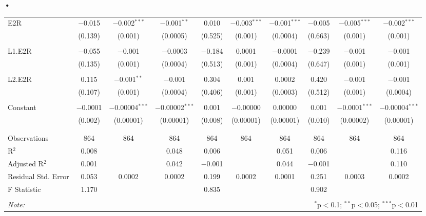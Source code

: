 \textbf{\textbf{•}}\documentclass[a4paper]{article}
\begin{document}
\begin{table}[!htbp]
{\begin{tabular}{@{\extracolsep{5pt}}lccccccccc}
 E2R & $-$0.015 & $-$0.002$^{***}$ & $-$0.001$^{**}$ & 0.010 & $-$0.003$^{***}$ & $-$0.001$^{***}$ & $-$0.005 & $-$0.005$^{***}$ & $-$0.002$^{***}$ \\ 
  & (0.139) & (0.001) & (0.0005) & (0.525) & (0.001) & (0.0004) & (0.663) & (0.001) & (0.001) \\ 
  & & & & & & & & & \\ 
 L1.E2R & $-$0.055 & $-$0.001 & $-$0.0003 & $-$0.184 & 0.0001 & $-$0.0001 & $-$0.239 & $-$0.001 & $-$0.001 \\ 
  & (0.135) & (0.001) & (0.0004) & (0.513) & (0.001) & (0.0004) & (0.647) & (0.001) & (0.001) \\ 
  & & & & & & & & & \\ 
 L2.E2R & 0.115 & $-$0.001$^{**}$ & $-$0.001 & 0.304 & 0.001 & 0.0002 & 0.420 & $-$0.001 & $-$0.001 \\ 
  & (0.107) & (0.001) & (0.0004) & (0.406) & (0.001) & (0.0003) & (0.512) & (0.001) & (0.0004) \\ 
  & & & & & & & & & \\ 
 Constant & $-$0.0001 & $-$0.00004$^{***}$ & $-$0.00002$^{***}$ & 0.001 & $-$0.00000 & 0.00000 & 0.001 & $-$0.0001$^{***}$ & $-$0.00004$^{***}$ \\ 
  & (0.002) & (0.00001) & (0.00001) & (0.008) & (0.00001) & (0.00001) & (0.010) & (0.00002) & (0.00001) \\ 
  & & & & & & & & & \\ 
\hline \\[-1.8ex] 
Observations & 864 & 864 & 864 & 864 & 864 & 864 & 864 & 864 & 864 \\ 
R$^{2}$ & 0.008 &  & 0.048 & 0.006 &  & 0.051 & 0.006 &  & 0.116 \\ 
Adjusted R$^{2}$ & 0.001 &  & 0.042 & $-$0.001 &  & 0.044 & $-$0.001 &  & 0.110 \\ 
Residual Std. Error & 0.053 & 0.0002 & 0.0002 & 0.199 & 0.0002 & 0.0001 & 0.251 & 0.0003 & 0.0002 \\ 
F Statistic & 1.170 &  &  & 0.835 &  &  & 0.902 &  &  \\ 
\hline 
\hline \\[-1.8ex] 
\textit{Note:}  & \multicolumn{9}{r}{$^{*}$p$<$0.1; $^{**}$p$<$0.05; $^{***}$p$<$0.01} \\ 
\end{tabular} 
}
\end{table} 
\FloatBarrier
\end{document}
